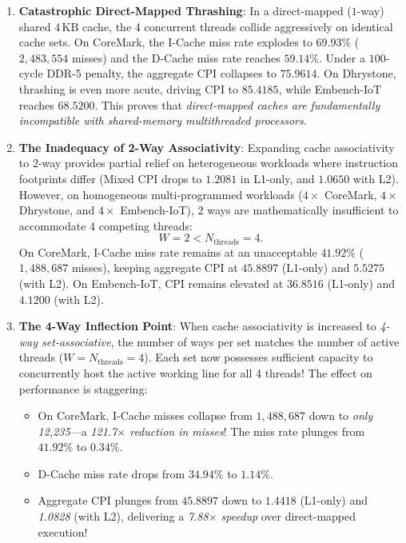 \begin{enumerate}
    \item \textbf{Catastrophic Direct-Mapped Thrashing}:
    In a direct-mapped ($1$-way) shared $4\,\text{KB}$ cache, the 4 concurrent threads collide aggressively on identical cache sets. On CoreMark, the I-Cache miss rate explodes to $\mathbf{69.93\%}$ ($2,483,554$ misses) and the D-Cache miss rate reaches $\mathbf{59.14\%}$. Under a $100$-cycle DDR-5 penalty, the aggregate CPI collapses to $\mathbf{75.9614}$. On Dhrystone, thrashing is even more acute, driving CPI to $\mathbf{85.4185}$, while Embench-IoT reaches $\mathbf{68.5200}$. This proves that \textit{direct-mapped caches are fundamentally incompatible with shared-memory multithreaded processors}.
    \item \textbf{The Inadequacy of 2-Way Associativity}:
    Expanding cache associativity to 2-way provides partial relief on heterogeneous workloads where instruction footprints differ (Mixed CPI drops to $1.2081$ in L1-only, and $1.0650$ with L2). However, on homogeneous multi-programmed workloads ($4\times$ CoreMark, $4\times$ Dhrystone, and $4\times$ Embench-IoT), 2 ways are mathematically insufficient to accommodate 4 competing threads:
    \begin{equation}
    W = 2 < N_{\text{threads}} = 4.
    \end{equation}
    On CoreMark, I-Cache miss rate remains at an unacceptable $\mathbf{41.92\%}$ ($1,488,687$ misses), keeping aggregate CPI at $\mathbf{45.8897}$ (L1-only) and $5.5275$ (with L2). On Embench-IoT, CPI remains elevated at $36.8516$ (L1-only) and $4.1200$ (with L2).
    \item \textbf{The 4-Way Inflection Point}:
    When cache associativity is increased to \textit{4-way set-associative}, the number of ways per set matches the number of active threads ($W = N_{\text{threads}} = 4$). Each set now possesses sufficient capacity to concurrently host the active working line for all 4 threads!
    The effect on performance is staggering:
    \begin{itemize}
        \item On CoreMark, I-Cache misses collapse from $1,488,687$ down to \textit{only 12,235}---a \textit{121.7$\times$ reduction in misses}! The miss rate plunges from $41.92\%$ to $\mathbf{0.34\%}$.
        \item D-Cache miss rate drops from $34.94\%$ to $\mathbf{1.14\%}$.
        \item Aggregate CPI plunges from $45.8897$ down to $\mathbf{1.4418}$ (L1-only) and \textit{1.0828} (with L2), delivering a \textit{7.88$\times$ speedup} over direct-mapped execution!

\end{itemize}
\end{enumerate}
